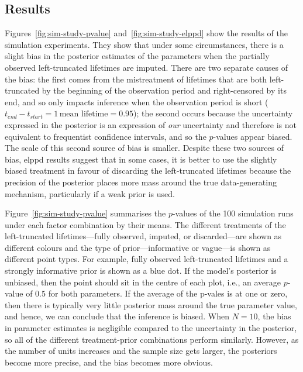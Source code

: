 \subsection{Results} \label{subsec:sim-experiment-results}

Figures~\ref{fig:sim-study-pvalue} and~\ref{fig:sim-study-elppd} show the results of the simulation experiments. They show that under some circumstances, there is a slight bias in the posterior estimates of the parameters when the partially observed left-truncated lifetimes are imputed. There are two separate causes of the bias: the first comes from the mistreatment of lifetimes that are both left-truncated by the beginning of the observation period and right-censored by its end, and so only impacts inference when the observation period is short ($t_{end} - t_{start} = 1 \, \text{mean lifetime} = 0.95$); the second occurs because the uncertainty expressed in the posterior is an expression of \textit{our} uncertainty and therefore is not equivalent to frequentist confidence intervals, and so the $p$-values appear biased. The scale of this second source of bias is smaller. Despite these two sources of bias, elppd results suggest that in some cases, it is better to use the slightly biased treatment in favour of discarding the left-truncated lifetimes because the precision of the posterior places more mass around the true data-generating mechanism, particularly if a weak prior is used.

Figure~\ref{fig:sim-study-pvalue} summarises the $p$-values of the 100 simulation runs under each factor combination by their means. The different treatments of the left-truncated lifetimes---fully observed, imputed, or discarded---are shown as different colours and the type of prior---informative or vague---is shown as different point types. For example, fully observed left-truncated lifetimes and a strongly informative prior is shown as a blue dot. If the model's posterior is unbiased, then the point should sit in the centre of each plot, i.e., an average $p$-value of $0.5$ for both parameters. If the average of the p-vales is at one or zero, then there is typically very little posterior mass around the true parameter value, and hence, we can conclude that the inference is biased. When $N = 10$, the bias in parameter estimates is negligible compared to the uncertainty in the posterior, so all of the different treatment-prior combinations perform similarly. However, as the number of units increases and the sample size gets larger, the posteriors become more precise, and the bias becomes more obvious.

